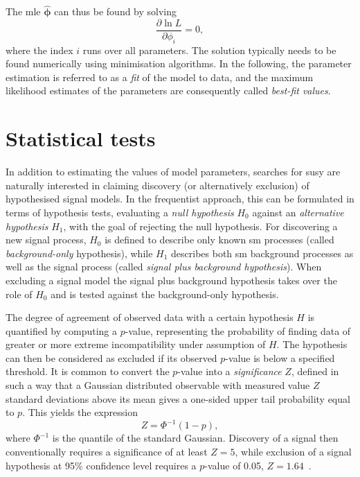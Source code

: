 The \gls{mle} $\boldsymbol{\hat{\phi}}$ can thus be found by solving
\begin{equation}
 \frac{\partial \ln L}{\partial\phi_i} = 0,
\end{equation}
where the index $i$ runs over all parameters. The solution typically needs to be found numerically using minimisation algorithms. In the following, the parameter estimation is referred to as a \textit{fit} of the model to data, and the maximum likelihood estimates of the parameters are consequently called \textit{best-fit values}.

\section{Statistical tests}

In addition to estimating the values of model parameters, searches for \gls{susy} are naturally interested in claiming discovery (or alternatively exclusion) of hypothesised signal models. In the frequentist approach, this can be formulated in terms of hypothesis tests, evaluating a \textit{null hypothesis} $H_0$ against an \textit{alternative hypothesis} $H_1$, with the goal of rejecting the null hypothesis. For discovering a new signal process, $H_0$ is defined to describe only known \gls{sm} processes (called \textit{background-only} hypothesis), while $H_1$ describes both \gls{sm} background processes as well as the signal process (called \textit{signal plus background hypothesis}). When excluding a signal model the signal plus background hypothesis takes over the role of $H_0$ and is tested against the background-only hypothesis.

The degree of agreement of observed data with a certain hypothesis $H$ is quantified by computing a $p$-value, representing the probability of finding data of greater or more extreme incompatibility under assumption of $H$. The hypothesis can then be considered as excluded if its observed $p$-value is below a specified threshold. It is common to convert the $p$-value into a \textit{significance} $Z$, defined in such a way that a Gaussian distributed observable with measured value $Z$ standard deviations above its mean gives a one-sided upper tail probability equal to $p$. This yields the expression
\begin{equation}
	Z = \Phi^{-1}(1-p),
\end{equation}
where $\Phi^{-1}$ is the quantile of the standard Gaussian. Discovery of a signal then conventionally requires a significance of at least $Z = 5$, while exclusion of a signal hypothesis at 95\% confidence level requires a $p$-value of 0.05, \ie $Z = 1.64$~\cite{Cowan:2010js}. 

